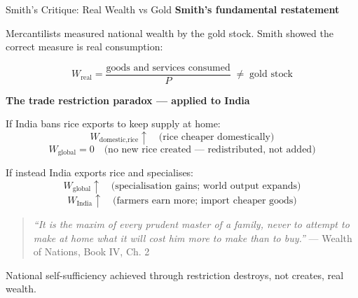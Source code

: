 \documentclass[
  ignorenonframetext,
  aspectratio=169,
]{beamer}
\makeatletter
\let\quarto@originallabel\label
\DeclareRobustCommand*{\label}[1]{\quarto@originallabel{#1}}
\makeatother
\begin{document}
\begin{frame}{Smith's Critique: Real Wealth vs Gold}
\label{smiths-critique-real-wealth-vs-gold}
\textbf{Smith's fundamental restatement}

Mercantilists measured national wealth by the gold stock. Smith showed
the correct measure is real consumption:

\[W_{\text{real}} = \frac{\text{goods and services consumed}}{P} \;\neq\; \text{gold stock}\]

\textbf{The trade restriction paradox --- applied to India}

If India bans rice exports to keep supply at home:
\[W_{\text{domestic,rice}} \uparrow \quad \text{(rice cheaper domestically)}\]
\[W_{\text{global}} = 0 \quad \text{(no new rice created — redistributed, not added)}\]

If instead India exports rice and specialises:
\[W_{\text{global}} \uparrow \quad \text{(specialisation gains; world output expands)}\]
\[W_{\text{India}} \uparrow \quad \text{(farmers earn more; import cheaper goods)}\]

\begin{quote}
\emph{``It is the maxim of every prudent master of a family, never to
attempt to make at home what it will cost him more to make than to
buy.''} --- Wealth of Nations, Book IV, Ch. 2
\end{quote}

National self-sufficiency achieved through restriction destroys, not
creates, real wealth.
\end{frame}
\end{document}
